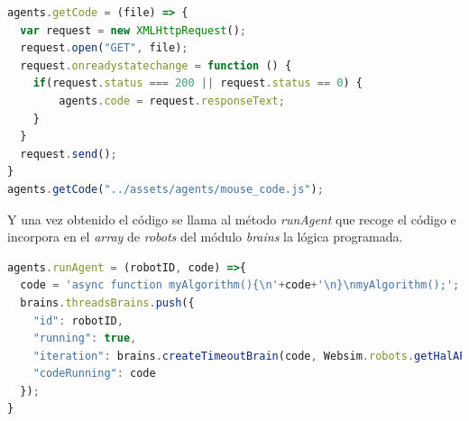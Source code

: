 \begin{lstlisting}[language=javascript]
agents.getCode = (file) => {
  var request = new XMLHttpRequest();
  request.open("GET", file);
  request.onreadystatechange = function () {
    if(request.status === 200 || request.status == 0) {
        agents.code = request.responseText;
    }
  }
  request.send();
}
agents.getCode("../assets/agents/mouse_code.js");
\end{lstlisting}

Y una vez obtenido el código se llama al método \textit{runAgent} que recoge el código e incorpora en el \textit{array} de \textit{robots} del módulo \textit{brains} la lógica programada.

\begin{lstlisting}[language=javascript]
agents.runAgent = (robotID, code) =>{
  code = 'async function myAlgorithm(){\n'+code+'\n}\nmyAlgorithm();';
  brains.threadsBrains.push({
    "id": robotID,
    "running": true,
    "iteration": brains.createTimeoutBrain(code, Websim.robots.getHalAPI(robotID), robotID),
    "codeRunning": code
  });
}
\end{lstlisting}